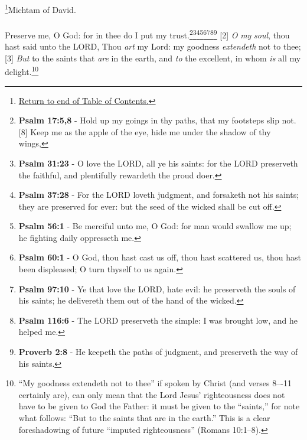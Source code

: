 \footnote{\textcolor[rgb]{0.00,0.25,0.00}{\hyperlink{TOC}{Return to end of Table of Contents.}}}\textcolor[cmyk]{0.99998,1,0,0}{Michtam of David.}\\
\\
\textcolor[cmyk]{0.99998,1,0,0}{Preserve me, O God: for in thee do I put my trust.}\footnote{\textbf{Psalm 17:5,8} - Hold up my goings in thy paths, that my footsteps slip not. [8] Keep me as the apple of the eye, hide me under the shadow of thy wings,}\footnote{\textbf{Psalm 31:23} - O love the LORD, all ye his saints: for the LORD preserveth the faithful, and plentifully rewardeth the proud doer.}\footnote{\textbf{Psalm 37:28} - For the LORD loveth judgment, and forsaketh not his saints; they are preserved for ever: but the seed of the wicked shall be cut off.}\footnote{\textbf{Psalm 56:1} - Be merciful unto me, O God: for man would swallow me up; he fighting daily oppresseth me.}\footnote{\textbf{Psalm 60:1} - O God, thou hast cast us off, thou hast scattered us, thou hast been displeased; O turn thyself to us again.}\footnote{\textbf{Psalm 97:10} - Ye that love the LORD, hate evil: he preserveth the souls of his saints; he delivereth them out of the hand of the wicked.}\footnote{\textbf{Psalm 116:6} - The LORD preserveth the simple: I was brought low, and he helped me.}\footnote{\textbf{Proverb 2:8} - He keepeth the paths of judgment, and preserveth the way of his saints.}
[2] \textcolor[cmyk]{0.99998,1,0,0}{\emph{O} \emph{my} \emph{soul}, thou hast said unto the LORD, Thou \emph{art} my Lord: my goodness \emph{extendeth} not to thee;}
[3] \textcolor[cmyk]{0.99998,1,0,0}{\emph{But} to the saints that \emph{are} in the earth, and \emph{to} the excellent, in whom \emph{is} all my delight.}\footnote{``My goodness extendeth not to thee'' if spoken by Christ (and verses 8–-11 certainly are), can only mean that the Lord Jesus’ righteousness does not have to be given to God the Father: it must be given to the ``saints,'' for note what follows: ``But to the saints that are in the earth.'' This is a clear foreshadowing of future ``imputed righteousness'' (Romans 10:1–8).\cite{Ruckman1992Psalms}}
